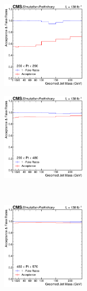       \begin{figure}[htp!]
        \begin{subfigure}
          \centering
          \includegraphics[width=0.45\textwidth]{figures/multijet/dijet/fakerates_groomed_0.pdf}
        \end{subfigure} 
        \begin{subfigure}
          \centering
          \includegraphics[width=0.45\textwidth]{figures/multijet/dijet/fakerates_groomed_1.pdf}
        \end{subfigure} \\
        \begin{subfigure}
          \centering
          \includegraphics[width=0.45\textwidth]{figures/multijet/dijet/fakerates_groomed_2.pdf}

\end{subfigure}
\end{figure}
